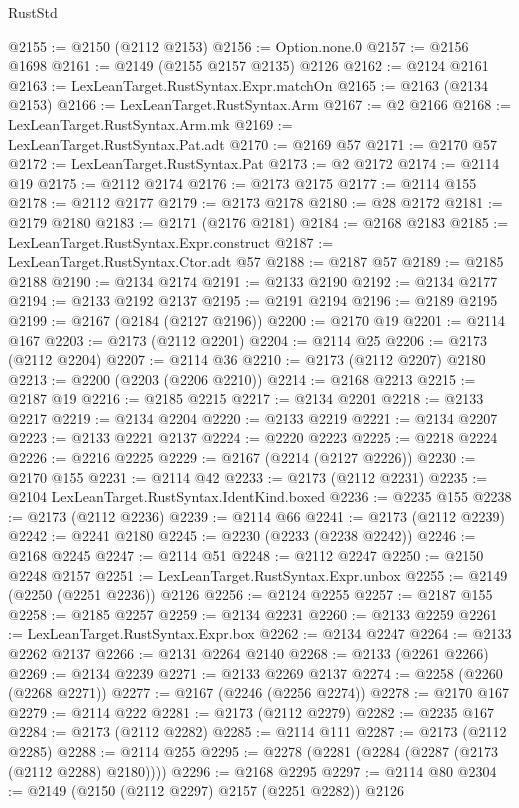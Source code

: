 \begin{lexlean}{RustStd}
\begin{coremodule}
@2155 := @2150 (@2112 @2153)
@2156 := Option.none.{0}
@2157 := @2156 @1698
@2161 := @2149 (@2155 @2157 @2135) @2126
@2162 := @2124 @2161
@2163 := LexLeanTarget.RustSyntax.Expr.matchOn
@2165 := @2163 (@2134 @2153)
@2166 := LexLeanTarget.RustSyntax.Arm
@2167 := @2 @2166
@2168 := LexLeanTarget.RustSyntax.Arm.mk
@2169 := LexLeanTarget.RustSyntax.Pat.adt
@2170 := @2169 @57
@2171 := @2170 @57
@2172 := LexLeanTarget.RustSyntax.Pat
@2173 := @2 @2172
@2174 := @2114 @19
@2175 := @2112 @2174
@2176 := @2173 @2175
@2177 := @2114 @155
@2178 := @2112 @2177
@2179 := @2173 @2178
@2180 := @28 @2172
@2181 := @2179 @2180
@2183 := @2171 (@2176 @2181)
@2184 := @2168 @2183
@2185 := LexLeanTarget.RustSyntax.Expr.construct
@2187 := LexLeanTarget.RustSyntax.Ctor.adt @57
@2188 := @2187 @57
@2189 := @2185 @2188
@2190 := @2134 @2174
@2191 := @2133 @2190
@2192 := @2134 @2177
@2194 := @2133 @2192 @2137
@2195 := @2191 @2194
@2196 := @2189 @2195
@2199 := @2167 (@2184 (@2127 @2196))
@2200 := @2170 @19
@2201 := @2114 @167
@2203 := @2173 (@2112 @2201)
@2204 := @2114 @25
@2206 := @2173 (@2112 @2204)
@2207 := @2114 @36
@2210 := @2173 (@2112 @2207) @2180
@2213 := @2200 (@2203 (@2206 @2210))
@2214 := @2168 @2213
@2215 := @2187 @19
@2216 := @2185 @2215
@2217 := @2134 @2201
@2218 := @2133 @2217
@2219 := @2134 @2204
@2220 := @2133 @2219
@2221 := @2134 @2207
@2223 := @2133 @2221 @2137
@2224 := @2220 @2223
@2225 := @2218 @2224
@2226 := @2216 @2225
@2229 := @2167 (@2214 (@2127 @2226))
@2230 := @2170 @155
@2231 := @2114 @42
@2233 := @2173 (@2112 @2231)
@2235 := @2104 LexLeanTarget.RustSyntax.IdentKind.boxed
@2236 := @2235 @155
@2238 := @2173 (@2112 @2236)
@2239 := @2114 @66
@2241 := @2173 (@2112 @2239)
@2242 := @2241 @2180
@2245 := @2230 (@2233 (@2238 @2242))
@2246 := @2168 @2245
@2247 := @2114 @51
@2248 := @2112 @2247
@2250 := @2150 @2248 @2157
@2251 := LexLeanTarget.RustSyntax.Expr.unbox
@2255 := @2149 (@2250 (@2251 @2236)) @2126
@2256 := @2124 @2255
@2257 := @2187 @155
@2258 := @2185 @2257
@2259 := @2134 @2231
@2260 := @2133 @2259
@2261 := LexLeanTarget.RustSyntax.Expr.box
@2262 := @2134 @2247
@2264 := @2133 @2262 @2137
@2266 := @2131 @2264 @2140
@2268 := @2133 (@2261 @2266)
@2269 := @2134 @2239
@2271 := @2133 @2269 @2137
@2274 := @2258 (@2260 (@2268 @2271))
@2277 := @2167 (@2246 (@2256 @2274))
@2278 := @2170 @167
@2279 := @2114 @222
@2281 := @2173 (@2112 @2279)
@2282 := @2235 @167
@2284 := @2173 (@2112 @2282)
@2285 := @2114 @111
@2287 := @2173 (@2112 @2285)
@2288 := @2114 @255
@2295 := @2278 (@2281 (@2284 (@2287 (@2173 (@2112 @2288) @2180))))
@2296 := @2168 @2295
@2297 := @2114 @80
@2304 := @2149 (@2150 (@2112 @2297) @2157 (@2251 @2282)) @2126

\end{coremodule}
\end{lexlean}
